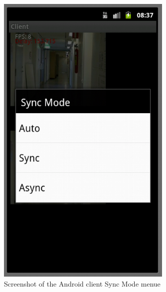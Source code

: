 \documentclass[8pt,titlepage]{article}
\begin{document}
\begin{figure}[hbp]
\includegraphics[width=0.75\textwidth]{../screenshots/androidSyncMode.png}
\caption{Screenshot of the Android client Sync Mode menue}
\end{figure}
\end{document}
